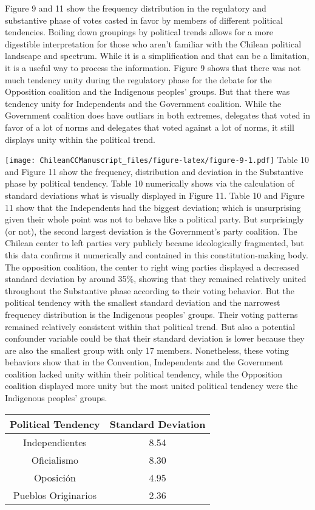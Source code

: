 \documentclass[
]{article}
\begin{document}
Figure 9 and 11 show the frequency distribution in the regulatory and
substantive phase of votes casted in favor by members of different
political tendencies. Boiling down groupings by political trends allows
for a more digestible interpretation for those who aren't familiar with
the Chilean political landscape and spectrum. While it is a
simplification and that can be a limitation, it is a useful way to
process the information. Figure 9 shows that there was not much tendency
unity during the regulatory phase for the debate for the Opposition
coalition and the Indigenous peoples' groups. But that there was
tendency unity for Independents and the Government coalition. While the
Government coalition does have outliars in both extremes, delegates that
voted in favor of a lot of norms and delegates that voted against a lot
of norms, it still displays unity within the political trend.

\texttt{[image: ChileanCCManuscript\_files/figure-latex/figure-9-1.pdf]}
Table 10 and Figure 11 show the frequency, distribution and deviation in
the Substantive phase by political tendency. Table 10 numerically shows
via the calculation of standard deviations what is visually displayed in
Figure 11. Table 10 and Figure 11 show that the Independents had the
biggest deviation; which is unsurprising given their whole point was not
to behave like a political party. But surprisingly (or not), the second
largest deviation is the Government's party coalition. The Chilean
center to left parties very publicly became ideologically fragmented,
but this data confirms it numerically and contained in this
constitution-making body. The opposition coalition, the center to right
wing parties displayed a decreased standard deviation by around 35\%,
showing that they remained relatively united throughout the Substantive
phase according to their voting behavior. But the political tendency
with the smallest standard deviation and the narrowest frequency
distribution is the Indigenous peoples' groups. Their voting patterns
remained relatively consistent within that political trend. But also a
potential confounder variable could be that their standard deviation is
lower because they are also the smallest group with only 17 members.
Nonetheless, these voting behaviors show that in the Convention,
Independents and the Government coalition lacked unity within their
political tendency, while the Opposition coalition displayed more unity
but the most united political tendency were the Indigenous peoples'
groups.

\begin{longtable}[]{@{}cc@{}}
\toprule()
Political Tendency & Standard Deviation \\
\midrule()
\endhead
Independientes & 8.54 \\
Oficialismo & 8.30 \\
Oposición & 4.95 \\
Pueblos Originarios & 2.36 \\
\bottomrule()
\end{longtable}
\end{document}
